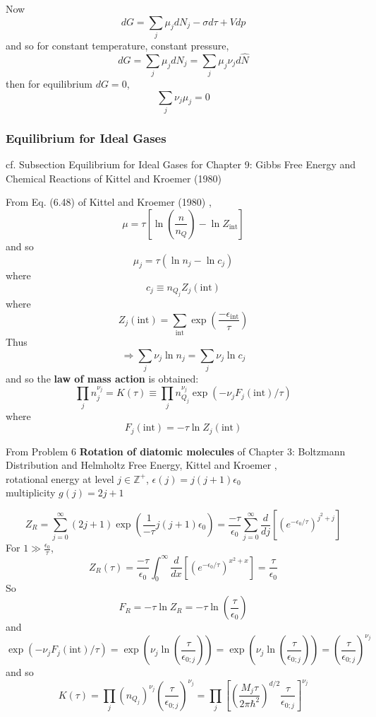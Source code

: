 \documentclass[10pt]{amsart}
\begin{document}
\begin{multicols*}{2}
Now
\[
dG = \sum_j \mu_j dN_j - \sigma d\tau + Vdp
\]
and so for constant temperature, constant pressure, 
\[
dG = \sum_j \mu_j dN_j = \sum_j \mu_j \nu_j d\widehat{N} 
\]
then for equilibrium $dG=0$, 
\begin{equation}
\boxed{ \sum_j \nu_j \mu_j = 0 }
\end{equation}


\subsubsection{Equilibrium for Ideal Gases}

cf. Subsection Equilibrium for Ideal Gases for Chapter 9: Gibbs Free Energy and Chemical Reactions of Kittel and Kroemer (1980) \cite{CKittelHKroemer1980}

From Eq. (6.48) of Kittel and Kroemer (1980) \cite{CKittelHKroemer1980}, 
\[
\mu = \tau [ \ln{ \left( \frac{n}{n_Q} \right)} - \ln{ Z_{\text{int}} } ]
\]
and so
\[
\mu_j = \tau (\ln{ n_j} - \ln{c_j})
\]
where 
\[
c_j \equiv n_{Q_j} Z_j(\text{int})
\]
where
\[
Z_j(\text{int}) = \sum_{\text{int}} \exp{ \left( \frac{-\epsilon_{\text{int}} }{\tau} \right) }
\]
Thus
\[
\Longrightarrow \sum_j \nu_j \ln{n_j} = \sum_j \nu_j \ln{c_j}
\]
and so the \textbf{law of mass action} is obtained:
\begin{equation}
  \boxed{ \prod_j n_j^{\nu_j} = K(\tau) \equiv \prod_j n_{Q_j}^{\nu_j} \exp{ \left( -\nu_j F_j(\text{int})/ \tau \right) }  }
\end{equation}
where
\[
F_j(\text{int}) = -\tau \ln{Z_j(\text{int}) }
\]

From Problem 6 \textbf{Rotation of diatomic molecules} of Chapter 3: Boltzmann Distribution and Helmholtz Free Energy, Kittel and Kroemer \cite{CKittelHKroemer1980}, \\
rotational energy at level $j\in \mathbb{Z}^+$, $\epsilon(j) = j(j+1) \epsilon_0$ \\
multiplicity $g(j) = 2j+1$

\[
Z_R = \sum_{j=0}^{\infty} (2j+1)\exp{ \left( \frac{1}{-\tau} j(j+1) \epsilon_0 \right) } = \frac{-\tau}{\epsilon_0} \sum_{j=0}^{\infty} \frac{d}{dj} \left[ (e^{-\epsilon_0 /\tau})^{j^2+j} \right] 
\]
For $1 \gg \frac{\epsilon_0}{\tau}$, 
\[
Z_R(\tau) = \frac{-\tau}{\epsilon_0} \int_0^{\infty} \frac{d}{dx} \left[ (e^{-\epsilon_0/\tau})^{x^2 + x} \right] = \frac{\tau}{\epsilon_0}
\]
So 
\[
F_R = -\tau \ln{Z_R} = -\tau \ln{ \left( \frac{\tau}{\epsilon_0} \right)}
\]
and 
\[
\exp{ (-\nu_j F_j(\text{int})/\tau) } = \exp{ ( \nu_j \ln{ \left( \frac{\tau}{\epsilon_{0;j}} \right) } ) } = \exp{ ( \nu_j \ln{ \left( \frac{\tau}{\epsilon_{0;j}} \right) } ) } = \left( \frac{\tau}{\epsilon_{0;j} } \right)^{\nu_j}
\]
and so 
\[
K(\tau) = \prod_j (n_{Q_j})^{\nu_j} \left( \frac{\tau}{\epsilon_{0;j}} \right)^{\nu_j} = \prod_j \left[ \left( \frac{ M_j \tau }{ 2\pi \hbar^2} \right)^{d/2} \frac{\tau}{ \epsilon_{0;j} } \right]^{\nu_j}
\]






\end{multicols*}
\end{document}
